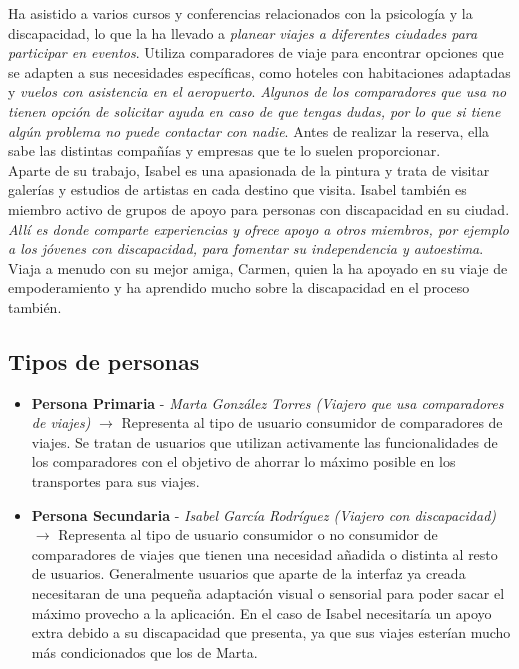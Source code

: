 Ha asistido a varios cursos y conferencias relacionados con la psicología y la discapacidad, lo que la ha llevado a 
\textit{planear viajes a diferentes ciudades para participar en eventos}. Utiliza comparadores de viaje para encontrar opciones 
que se adapten a sus necesidades específicas, como hoteles con habitaciones adaptadas y \textit{vuelos con asistencia en el 
aeropuerto}. \textit{Algunos de los comparadores que usa no tienen opción de solicitar ayuda en caso de que tengas dudas, por lo que si
tiene algún problema no puede contactar con nadie}. Antes de realizar la reserva, ella sabe las distintas compañías y empresas que te lo suelen proporcionar. \\

Aparte de su trabajo, Isabel es una apasionada de la pintura y trata de visitar galerías y estudios de artistas en cada 
destino que visita. Isabel también es miembro activo de grupos de apoyo para personas con discapacidad en su ciudad. \textit{Allí 
es donde comparte experiencias y ofrece apoyo a otros miembros, por ejemplo a los jóvenes con discapacidad, para fomentar 
su independencia y autoestima}. Viaja a menudo con su mejor amiga, Carmen, quien la ha apoyado en su viaje de empoderamiento 
y ha aprendido mucho sobre la discapacidad en el proceso también.

\subsection{Tipos de personas}
\begin{itemize}
    \item \textbf{Persona Primaria} - \textit{Marta González Torres (Viajero que usa comparadores de viajes)} $\rightarrow$ Representa al tipo de usuario consumidor de comparadores de viajes. Se tratan de usuarios que utilizan activamente las funcionalidades de los comparadores con el objetivo de ahorrar lo máximo posible en los transportes para sus viajes.
    \item \textbf{Persona Secundaria} - \textit{Isabel García Rodríguez (Viajero con discapacidad)} $\rightarrow$ Representa al tipo de usuario consumidor o no consumidor de comparadores de viajes que tienen una necesidad añadida o distinta al resto de usuarios. 
    Generalmente usuarios que aparte de la interfaz ya creada necesitaran de una pequeña adaptación visual o sensorial para poder sacar el máximo provecho a la aplicación. En el caso de Isabel necesitaría un apoyo extra debido a su discapacidad que presenta, ya que sus viajes esterían mucho más condicionados que los de Marta.
\end{itemize}

